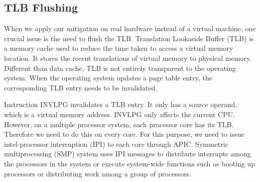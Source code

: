 \subsection{TLB Flushing}
%
%
%
%



When we apply our mitigation on real hardware instead of a virtual machine, one crucial issue is the need to flush the TLB.  Translation Lookaside Buffer (TLB) is a memory cache used to reduce the time taken to access a virtual memory location. It stores the recent translations of virtual memory to physical memory. Different than data cache, TLB is not entirely transparent to the operating system. When the operating system updates a page table entry, the corresponding TLB entry needs to be invalidated.

Instruction INVLPG invalidates a TLB entry. It only has a source operand, which is a virtual memory address. INVLPG only affects the current CPU. However, on a multiple processor system, each processor core has its TLB. Therefore we need to do this on every core. For this purpose, we need to issue intel-processor interruption (IPI) to each core through APIC. Symmetric multiprocessing (SMP) system uses IPI messages to distribute interrupts among the processors in the system or execute system-wide functions such as booting up processors or distributing work among a group of processors. 

